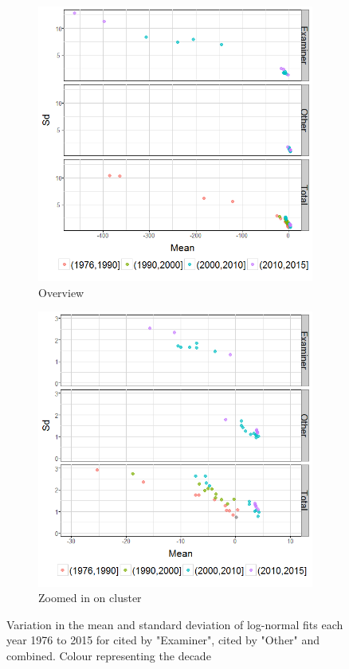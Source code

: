 \begin{figure}
\centering
\begin{subfigure}{.7\textwidth}
  \centering
  \includegraphics[width=0.9\linewidth]{Figures/logNormalParams}
 \caption[]{\small Overview}
\label{fig:logNormalParams}
\end{subfigure}%

\begin{subfigure}{.7\textwidth}
  \centering
  \includegraphics[width=0.9\linewidth]{Figures/logNormalParams_zoomed}
  \caption[]{\small Zoomed in on cluster}
\label{fig:logNormalParams_zoomed}
\end{subfigure}
\caption[Variation of Log-normal parameters over time]{Variation in the mean and standard deviation of log-normal fits each year 1976 to 2015 for cited by "Examiner", cited by "Other" and combined. Colour representing the decade}
\label{fig:logNormalParamPlots}
\end{figure}